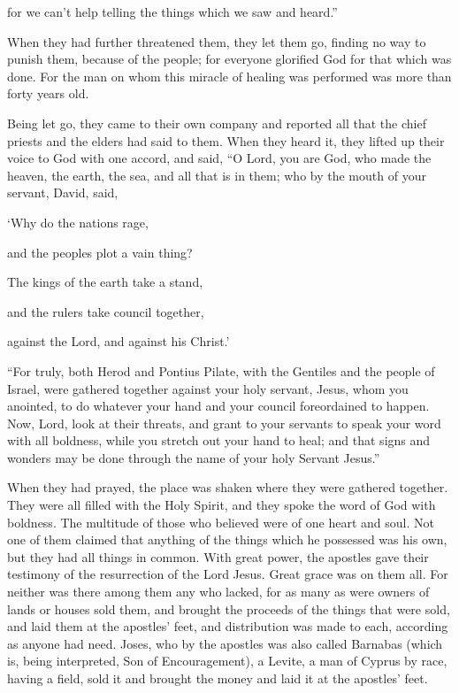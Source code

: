 {for we can’t help telling the things which we saw and heard.”
\par }{\PP {}When they had further threatened them, they let them go, finding no way to punish them, because of the people; for everyone glorified God for that which was done.
For the man on whom this miracle of healing was performed was more than forty years old.
\par }{\PP {}Being let go, they came to their own company and reported all that the chief priests and the elders had said to them.
When they heard it, they lifted up their voice to God with one accord, and said, “O Lord, you are God, who made the heaven, the earth, the sea, and all that is in them;
who by the mouth of your servant, David, said,
\par }{\Q ‘Why do the nations rage,
\par }{\QB and the peoples plot a vain thing?
\par }{\Q {}The kings of the earth take a stand,
\par }{\QB and the rulers take council together,
\par }{\QB against the Lord, and against his Christ.’
\par }{\PP {}“For truly, both Herod and Pontius Pilate, with the Gentiles and the people of Israel, were gathered together against your holy servant, Jesus, whom you anointed,
to do whatever your hand and your council foreordained to happen.
Now, Lord, look at their threats, and grant to your servants to speak your word with all boldness,
while you stretch out your hand to heal; and that signs and wonders may be done through the name of your holy Servant Jesus.”
\par }{\PP {}When they had prayed, the place was shaken where they were gathered together. They were all filled with the Holy Spirit, and they spoke the word of God with boldness.
The multitude of those who believed were of one heart and soul. Not one of them claimed that anything of the things which he possessed was his own, but they had all things in common.
With great power, the apostles gave their testimony of the resurrection of the Lord Jesus. Great grace was on them all.
For neither was there among them any who lacked, for as many as were owners of lands or houses sold them, and brought the proceeds of the things that were sold,
and laid them at the apostles’ feet, and distribution was made to each, according as anyone had need.
Joses, who by the apostles was also called Barnabas (which is, being interpreted, Son of Encouragement), a Levite, a man of Cyprus by race,
having a field, sold it and brought the money and laid it at the apostles’ feet.

}
